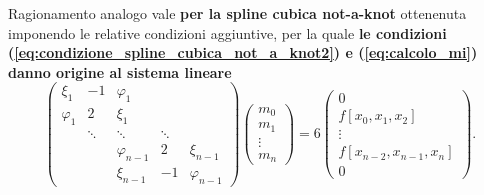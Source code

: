 Ragionamento analogo vale \textbf{per la spline cubica not-a-knot} ottenenuta imponendo le relative condizioni aggiuntive, per la quale \textbf{le condizioni (\ref{eq:condizione_spline_cubica_not_a_knot2}) e (\ref{eq:calcolo_mi}) danno origine al sistema lineare}
\begin{equation}\label{eq:sistema_tridiagonale_spline}
    \begin{pmatrix}
        \xi_1 & -1 & \varphi_1 && \\
        \varphi_1 & 2 & \xi_1&&\\
        &\ddots & \ddots &\ddots&\\
        &&\varphi_{n-1}& 2 &\xi_{n-1}\\
        && \xi_{n-1} & -1 & \varphi_{n-1}
    \end{pmatrix}\begin{pmatrix}
        m_0\\
        m_1\\
        \vdots\\
        m_{n}
    \end{pmatrix}=6\begin{pmatrix}
        0\\
        f[x_0,x_1,x_2]\\
        \vdots\\
        f[x_{n-2},x_{n-1},x_n]\\
        0
    \end{pmatrix}.
\end{equation}

